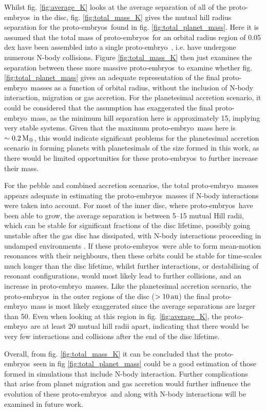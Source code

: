 \documentclass[a4paper,fleqn,usenatbib]{mnras}
\newcommand{\me}{{\, {\rm M}_{\oplus}}}
\newcommand{\au}{{\, {\rm au}}}
\newcommand{\emb}{{{proto-embryo~}}}
\newcommand{\embs}{{{proto-embryos~}}}
\begin{document}
Whilst fig. \ref{fig:average_K} looks at the average separation of all of the \embs in the disc, fig. \ref{fig:total_mass_K} gives the mutual hill radius separation for the \embs found in fig. \ref{fig:total_planet_mass}.
Here it is assumed that the total mass of \embs for an orbital radius region of 0.05 dex have been assembled into a single \emb, i.e. have undergone numerous N-body collisions.
Figure \ref{fig:total_mass_K} then just examines the separation between these more massive \embs to examine whether fig. \ref{fig:total_planet_mass} gives an adequate representation of the final \emb masses as a function of orbital radius, without the inclusion of N-body interaction, migration or gas accretion.
For the planetesimal accretion scenario, it could be considered that the assumption has exaggerated the final \emb mass, as the minimum hill separation here is approximately 15, implying very stable systems.
Given that the maximum \emb mass here is $\sim 0.2 \me$, this would indicate significant problems for the planetesimal accretion scenario in forming planets with planetesimals of the size formed in this work, as there would be limited opportunities for these \embs to further increase their mass.

For the pebble and combined accretion scenarios, the total \emb masses appears adequate in estimating the \embs masses if N-body interactions were taken into account.
For most of the inner disc, where \embs have been able to grow, the average separation is between 5--15 mutual Hill radii, which can be stable for significant fractions of the disc lifetime, possibly going unstable after the gas disc has dissipated, with N-body interactions proceeding in undamped environments \citep{ColemanNelson16}.
If these \embs were able to form mean-motion resonances with their neighbours, then these orbits could be stable for time-scales much longer than the disc lifetime, whilst further interactions, or destabilising of resonant configurations, would most likely lead to further collisions, and an increase in \emb masses.
Like the planetesimal accretion scenario, the \embs in the outer regions of the disc ($>10\au$) the final \emb mass is most likely exaggerated since the average separations are larger than 50.
Even when looking at this region in fig. \ref{fig:average_K}, the \emb are at least 20 mutual hill radii apart, indicating that there would be very few interactions and collisions after the end of the disc lifetime.

Overall, from fig. \ref{fig:total_mass_K} it can be concluded that the \embs seen in fig \ref{fig:total_planet_mass} could be a good estimation of those formed in simulations that include N-body interaction.
Further complications that arise from planet migration and gas accretion would further influence the evolution of these \embs and along with N-body interactions will be examined in future work.
\end{document}
